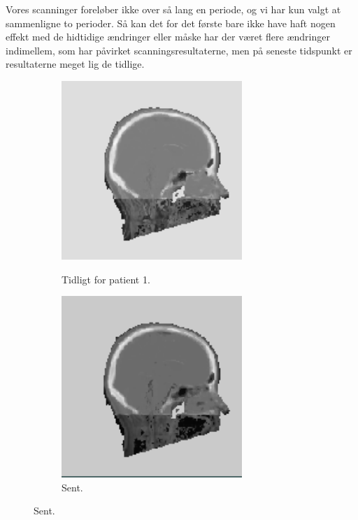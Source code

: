 Vores scanninger foreløber ikke over så lang en periode, og vi har
kun valgt at sammenligne to perioder. Så kan det for det første
bare ikke have haft nogen effekt med de hidtidige ændringer eller
måske har der været flere ændringer indimellem, som har påvirket
scanningsresultaterne, men på seneste tidspunkt er resultaterne meget
lig de tidlige.

\begin{figure}
    \centering
    \begin{subfigure}[b]{0.3\textwidth}
        \caption{Tidligt for patient 1.}
        \includegraphics[width=0.75\textwidth]{colager/over_tid_sct/over_tid_sct_121280_early.png}
        \label{col:over_time_sct_pat1_early}
    \end{subfigure}\hfill
    \begin{subfigure}[b]{0.3\textwidth}
        \caption{Sent.}
        \includegraphics[width=0.75\textwidth]{colager/over_tid_sct/over_tid_sct_121280_late.png}

\end{subfigure}
\end{figure}
